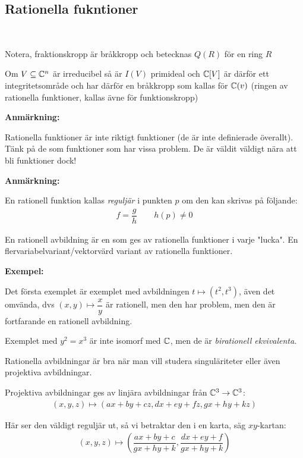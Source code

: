 \subsection{Rationella fukntioner}\hfill\\\par
\noindent Notera, fraktionskropp är bråkkropp och betecknas $Q(R)$ för en ring $R$
\par\bigskip
\noindent Om $V\subseteq\mathbb{C}^n$ är irreducibel så är $I(V)$ primideal och $\mathbb{C}[V]$ är därför ett integritetsområde och har därför en bråkkropp som kallas för $\mathbb{C}(v)$ (ringen av rationella funktioner, kallas ävne för funktionskropp)
\par\bigskip
\noindent\textbf{Anmärkning:}\par
\noindent Rationella funktioner är inte riktigt funktioner (de är inte definierade överallt). Tänk på de som funktioner som har vissa problem. De är väldit väldigt nära att bli funktioner dock! 
\par\bigskip
\noindent\textbf{Anmärkning:}\par
\noindent En rationell funktion kallas \textit{reguljär} i punkten $p$ om den kan skrivas på följande:
\begin{equation*}
  \begin{gathered}
    f = \dfrac{g}{h}\qquad\text{$h(p)\neq0$}
  \end{gathered}
\end{equation*}
\par\bigskip
\noindent En rationell avbildning är en som ges av rationella funktioner i varje "lucka". En flervariabelvariant/vektorvärd variant av rationella funktioner.
\par\bigskip
\noindent\textbf{Exempel:}\par
\noindent Det första exemplet är exemplet med avbildningen $t\mapsto (t^2,t^3)$, även det omvända, dvs $(x,y)\mapsto\dfrac{x}{y}$ är rationell, men den har problem, men den är fortfarande en rationell avbildning.
\par\bigskip
\noindent Exemplet med $y^2=x^3$ är inte isomorf med $\mathbb{C}$, men de är \textit{birationell ekvivalenta}.
\par\bigskip
\noindent Rationella avbildningar är bra när man vill studera singuläriteter eller även projektiva avbildningar.\par
\noindent Projektiva avbildningar ges av linjära avbildningar från $\mathbb{C}^3\to\mathbb{C}^3$:
\begin{equation*}
  \begin{gathered}
    (x,y,z)\mapsto(ax+by+cz,dx+ey+fz,gx+hy+kz)
  \end{gathered}
\end{equation*}\par
\noindent Här ser den väldigt reguljär ut, så vi betraktar den i en karta, säg $xy$-kartan:
\begin{equation*}
  \begin{gathered}
    (x,y,z)\mapsto\left(\dfrac{ax+by+c}{gx+hy+k},\dfrac{dx+ey+f}{gx+hy+k}\right)
  \end{gathered}
\end{equation*}
\par\bigskip
